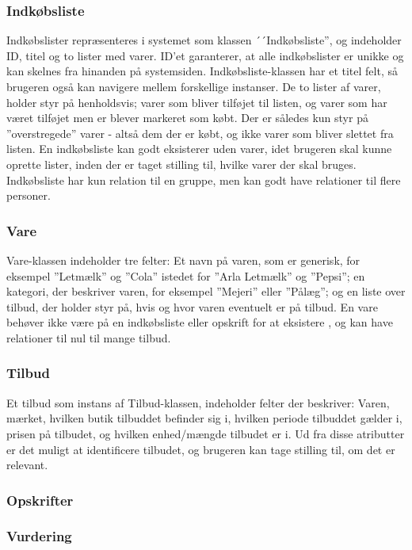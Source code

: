 \subsubsection{Indkøbsliste}
Indkøbslister repræsenteres i systemet som klassen ´´Indkøbsliste'', og indeholder ID, titel og to lister med varer.
ID'et garanterer, at alle indkøbslister er unikke og kan skelnes fra hinanden på systemsiden.
Indkøbsliste-klassen har et titel felt, så brugeren også kan navigere mellem forskellige instanser.
De to lister af varer, holder styr på henholdsvis; varer som bliver tilføjet til listen, og varer som har været tilføjet men er blever markeret som købt.
Der er således kun styr på ''overstregede'' varer - altså dem der er købt, og ikke varer som bliver slettet fra listen.
En indkøbsliste kan godt eksisterer uden varer, idet brugeren skal kunne oprette lister, inden der er taget stilling til, hvilke varer der skal bruges.
Indkøbsliste har kun relation til en gruppe, men kan godt have relationer til flere personer.

\subsubsection{Vare}
Vare-klassen indeholder tre felter: Et navn på varen, som er generisk, for eksempel ''Letmælk'' og ''Cola'' istedet for ''Arla Letmælk'' og ''Pepsi''; en kategori, der beskriver varen, for eksempel ''Mejeri'' eller ''Pålæg''; og en liste over tilbud, der holder styr på, hvis og hvor varen eventuelt er på tilbud.
En vare behøver ikke være på en indkøbsliste eller opskrift for at eksistere , og kan have relationer til nul til mange tilbud.

\subsubsection{Tilbud}
Et tilbud som instans af Tilbud-klassen, indeholder felter der beskriver: Varen, mærket, hvilken butik tilbuddet befinder sig i, hvilken periode tilbuddet gælder i, prisen på tilbudet, og hvilken enhed/mængde tilbudet er i.
Ud fra disse atributter er det muligt at identificere tilbudet, og brugeren kan tage stilling til, om det er relevant.


\subsubsection{Opskrifter}
\lipsum[1]

\subsubsection{Vurdering}
\lipsum[1]
